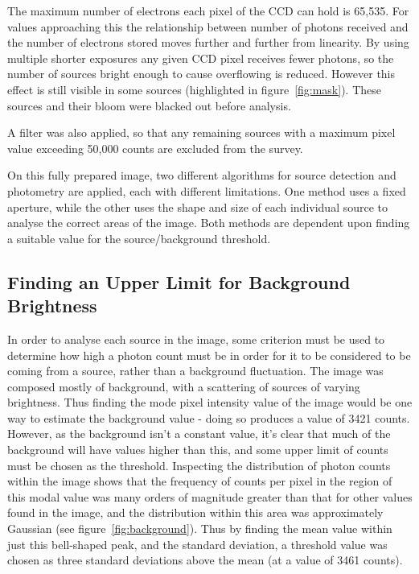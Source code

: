 \documentclass[a4paper,11pt,twoside]{article}
\begin{document}
The maximum number of electrons each pixel of the CCD can hold is 65,535. 
For values approaching this the relationship between number of photons 
received and the number of electrons stored moves further and further 
from linearity. By using multiple shorter exposures any given CCD pixel 
receives fewer photons, so the number of sources bright enough to cause 
overflowing is reduced. However this effect is still visible in some sources 
(highlighted in figure~\ref{fig:mask}). These sources and their bloom were
 blacked out before analysis.

A filter was also applied, so that any remaining sources with a maximum 
pixel value exceeding 50,000 counts are excluded from the survey.

On this fully prepared image, two different algorithms for source 
detection and photometry are applied, each with different limitations. 
One method uses a fixed aperture, while the other uses the shape and size of 
each individual source to analyse the correct areas of the image. Both 
methods are dependent upon finding a suitable value for the 
source/background threshold.

\subsection{Finding an Upper Limit for Background Brightness}

In order to analyse each source in the image, some criterion must be used 
to determine how high a photon count must be in order for it to be 
considered to be coming from a source, rather than a background fluctuation.
The image was composed mostly of background, with a scattering of sources 
of varying brightness. Thus finding the mode pixel intensity value of the 
image would be one way to estimate the background value - doing so produces 
a value of 3421 counts. However, as the background isn't a constant value, 
it's clear that much of the background will have values higher than this, 
and some upper limit of counts must be chosen as the threshold.
Inspecting the distribution of photon counts within the image shows that the frequency of counts per pixel in the region of this modal value was many orders of magnitude greater than that for other values found in the image, and the distribution within this area was approximately Gaussian (see figure~\ref{fig:background}). Thus by finding the mean value within just this bell-shaped peak, and the standard deviation, a threshold value was chosen as three standard deviations above the mean (at a value of 3461 counts).
\end{document}
